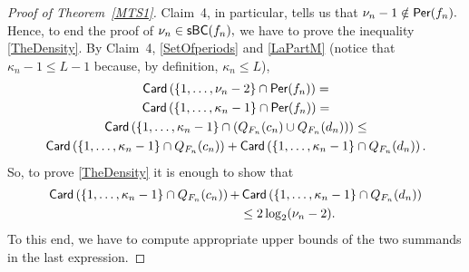 \documentclass[a4paper, 11pt]{amsart}
\numberwithin{equation}{section}
\theoremstyle{customnumberedtheorem}
\theoremstyle{definitionwithbfnote}
\DeclareMathOperator{\Per}{\textsf{\upshape Per}}
\DeclareMathOperator{\Card}{\textsf{\upshape Card}}
\DeclareMathOperator{\sbcset}{\textsf{\upshape sBC}}
\begin{document}
\begin{proof}[Proof of Theorem~\ref{MTS1}]
Claim~4, in particular, tells us that $\nu_n-1 \notin \Per(f_n).$
Hence, to end the proof of $\nu_n \in \sbcset(f_n),$
we have to prove the inequality \eqref{TheDensity}.
By Claim~4, \eqref{SetOfperiods} and \eqref{LaPartM}
(notice that $\kappa_n - 1 \le L-1$ because, by definition, $\kappa_n \le L$),
\begin{multline*}
  \Card\left(\{1,\dots, \nu_n-2\} \cap \Per(f_n)\right) = \\
  \Card\left(\{1,\dots, \kappa_n-1\} \cap \Per(f_n)\right) = \\
  \Card\left(\{1,\dots, \kappa_n-1\} \cap \left(Q_{F_n}(c_n) \cup Q_{F_n}(d_n)\right)\right) \le \\
  \Card\left(\{1,\dots, \kappa_n-1\} \cap Q_{F_n}(c_n) \right) + \Card\left(\{1,\dots, \kappa_n-1\} \cap Q_{F_n}(d_n)\right).
\end{multline*}
So, to prove \eqref{TheDensity} it is enough to show that
\begin{equation}\label{finaldensitybound}
\begin{split}
\Card\left(\{1,\dots, \kappa_n-1\} \cap Q_{F_n}(c_n) \right) +
  & \Card\left(\{1,\dots, \kappa_n-1\} \cap Q_{F_n}(d_n)\right) \\
  & \le 2 \log_2(\nu_n-2).
\end{split}
\end{equation}
To this end, we have to compute appropriate upper bounds of
the two summands in the last expression.


\end{proof}
\end{document}

